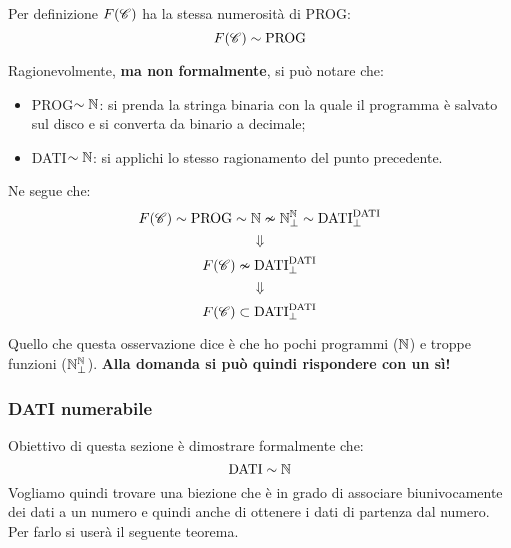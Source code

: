 Per definizione $F(\mathcal{C})$ ha la stessa numerosità di PROG:
$$ F(\mathcal{C}) \sim \text{PROG} $$

Ragionevolmente, \textbf{ma non formalmente}, si può notare che:
\begin{itemize}
    \item PROG$\sim\mathbb{N}$: si prenda la stringa binaria con la quale il programma è
        salvato sul disco e si converta da binario a decimale;
    \item DATI$\sim\mathbb{N}$: si applichi lo stesso ragionamento del punto precedente.
\end{itemize}
Ne segue che:
$$ F(\mathcal{C}) \sim \text{PROG} \sim \mathbb{N} \nsim\mathbb{N}^{\mathbb{N}}_\perp\sim \text{DATI}^\text{DATI}_\perp$$
$$ \Downarrow $$
$$ F(\mathcal{C}) \nsim \text{DATI}^\text{DATI}_\perp $$
$$ \Downarrow $$
$$ F(\mathcal{C}) \subset \text{DATI}^\text{DATI}_\perp $$

Quello che questa osservazione dice è che ho pochi programmi ($\mathbb{N}$) e troppe
funzioni ($\mathbb{N}^{\mathbb{N}}_\perp$).
\textbf{Alla domanda  si può quindi 
rispondere con un sì!}

\subsubsection{DATI numerabile}
Obiettivo di questa sezione è dimostrare formalmente che:
$$ \text{DATI} \sim \mathbb{N} $$
Vogliamo quindi trovare una biezione che è in grado di associare biunivocamente
dei dati a un numero e quindi anche di ottenere i dati di partenza dal
numero. Per farlo si userà il seguente teorema.

